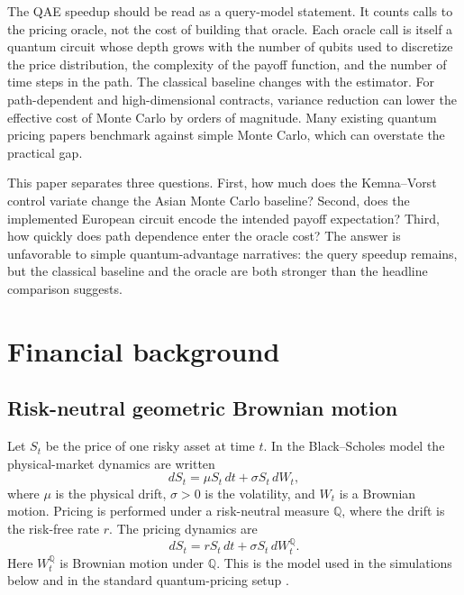 \documentclass[12pt]{article}
\begin{document}
The QAE speedup should be read as a query-model statement.  It counts calls to the pricing oracle, not the cost of building that oracle.  Each oracle call is itself a quantum circuit whose depth grows with the number of qubits used to discretize the price distribution, the complexity of the payoff function, and the number of time steps in the path.  The classical baseline changes with the estimator.  For path-dependent and high-dimensional contracts, variance reduction can lower the effective cost of Monte Carlo by orders of magnitude.  Many existing quantum pricing papers benchmark against simple Monte Carlo, which can overstate the practical gap.

This paper separates three questions.  First, how much does the Kemna--Vorst control variate change the Asian Monte Carlo baseline?  Second, does the implemented European circuit encode the intended payoff expectation?  Third, how quickly does path dependence enter the oracle cost?  The answer is unfavorable to simple quantum-advantage narratives: the query speedup remains, but the classical baseline and the oracle are both stronger than the headline comparison suggests.

\section{Financial background}

\subsection{Risk-neutral geometric Brownian motion}

Let $S_t$ be the price of one risky asset at time $t$.  In the Black--Scholes model the physical-market dynamics are written
\begin{equation}
    dS_t = \mu S_t\,dt + \sigma S_t\,dW_t,
\end{equation}
where $\mu$ is the physical drift, $\sigma>0$ is the volatility, and $W_t$ is a Brownian motion.  Pricing is performed under a risk-neutral measure $\mathbb{Q}$, where the drift is the risk-free rate $r$.  The pricing dynamics are
\begin{equation}
    dS_t = rS_t\,dt + \sigma S_t\,dW_t^{\mathbb{Q}}.
    \label{eq:risk-neutral-gbm}
\end{equation}
Here $W_t^{\mathbb{Q}}$ is Brownian motion under $\mathbb{Q}$.  This is the model used in the simulations below and in the standard quantum-pricing setup \cite{rebentrostQuantumComputationalFinance2018,stamatopoulosOptionPricingUsing2020}.
\end{document}
